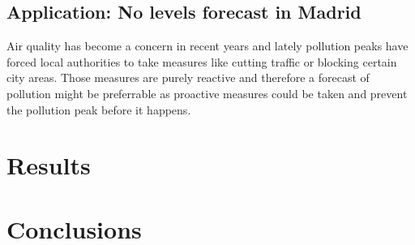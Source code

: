 \documentclass[a4paper,3p,sort&compress]{elsarticle}
\begin{document}
\subsection{Application: No levels forecast in Madrid}

Air quality has become a concern in recent years and lately pollution peaks have forced local authorities to take measures like cutting traffic or blocking certain city areas. Those measures are purely reactive and therefore a forecast of pollution might be preferrable as proactive measures could be taken and prevent the pollution peak before it happens.

\section{Results}
\label{sec:results}

\section{Conclusions}
\label{sec:concl}


\end{document}
